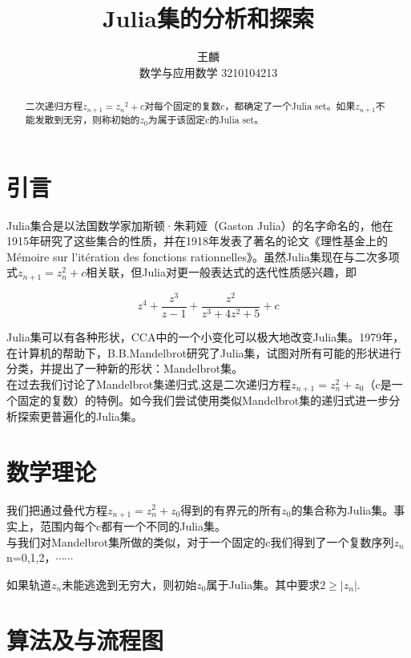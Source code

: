 \documentclass{ctexart}
\title{Julia集的分析和探索}
\author{王麟 \\ 数学与应用数学 3210104213}
\begin{document}
\maketitle
\begin{abstract}
二次递归方程$z_{n+1}={z_n}^2+c$对每个固定的复数c，都确定了一个Julia set。如果$z_{n+1}$不能发散到无穷，则称初始的$z_0$为属于该固定c的Julia set。
\end{abstract}

\section{引言}

\indent Julia集合是以法国数学家加斯顿·朱莉娅（Gaston Julia）的名字命名的，他在1915年研究了这些集合的性质，并在1918年发表了著名的论文《理性基金上的Mémoire sur l'itération des fonctions rationnelles》。虽然Julia集现在与二次多项式$z_{n+1}=z^2_n+c$相关联，但Julia对更一般表达式的迭代性质感兴趣，即

$$z^4+\frac{z^3}{z-1}+\frac{z^2}{z^3+4z^2+5}+c$$

Julia集可以有各种形状，CCA中的一个小变化可以极大地改变Julia集。1979年，在计算机的帮助下，B.B.Mandelbrot研究了Julia集，试图对所有可能的形状进行分类，并提出了一种新的形状：Mandelbrot集。\cite{ref3}\\
\indent 在过去我们讨论了Mandelbrot集递归式,这是二次递归方程$z_{n+1}=z^2_n+z_0$（c是一个固定的复数）的特例。如今我们尝试使用类似Mandelbrot集的递归式进一步分析探索更普遍化的Julia集。
\section{数学理论}
 我们把通过叠代方程$z_{n+1}=z^2_n+z_0$得到的有界元的所有$z_0$的集合称为Julia集。事实上，范围内每个c都有一个不同的Julia集。\cite{ref4} \\
 \indent 与我们对Mandelbrot集所做的类似，对于一个固定的c我们得到了一个复数序列$z_n$
n=0,1,2，$\cdots\cdots$

如果轨道$z_n$未能逃逸到无穷大，则初始$z_0$属于Julia集。其中要求$2\geq |z_n|$.

\section{算法及与流程图}
\end{document}
